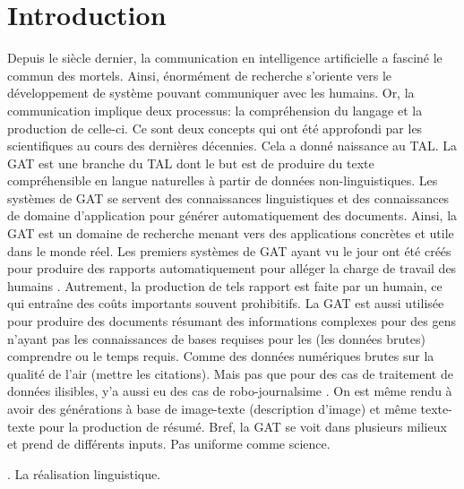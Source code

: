 
\chapter*{Introduction}


Depuis le siècle dernier, la communication en intelligence artificielle a fasciné le commun des mortels. Ainsi, énormément de recherche s'oriente vers le développement de système pouvant communiquer avec les humains. Or, la communication implique deux processus: la compréhension du langage et la production de celle-ci. Ce sont deux concepts qui ont été approfondi par les scientifiques au cours des dernières décennies. Cela a donné naissance au \ac{TAL}. La \ac{GAT} est une branche du \ac{TAL} dont le but est de produire du texte compréhensible en langue naturelles à partir de données non-linguistiques. Les systèmes de \ac{GAT} se servent des connaissances linguistiques et des connaissances de domaine d'application pour générer automatiquement des documents. Ainsi, la \ac{GAT} est un domaine de recherche menant vers des applications concrètes et utile dans le monde réel. Les premiers systèmes de \ac{GAT} ayant vu le jour ont été créés pour produire des rapports automatiquement pour alléger la charge de travail des humains \citep{ReiterBuildingNaturalLanguage2000}. Autrement, la production de tels rapport est faite par un humain, ce qui entraîne des coûts importants souvent prohibitifs. La \ac{GAT} est aussi utilisée pour produire des documents résumant des informations complexes pour des gens n'ayant pas les connaissances de bases requises pour les (les données brutes) comprendre ou le temps requis. Comme des données numériques brutes sur la qualité de l'air (mettre les citations). Mais pas que pour des cas de traitement de données ilisibles, y'a aussi eu des cas de robo-journalsime \citep{W17-3513}. On est même rendu à avoir des générations à base de image-texte (description d'image) et même texte-texte pour la production de résumé. Bref, la \ac{GAT} se voit dans plusieurs milieux et prend de différents inputs. Pas uniforme comme science.

. La réalisation linguistique.

